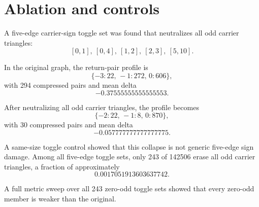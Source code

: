 \section{Ablation and controls}

A five-edge carrier-sign toggle set was found that neutralizes all odd carrier triangles:
\[
    [0,1],\ [0,4],\ [1,2],\ [2,3],\ [5,10].
\]

In the original graph, the return-pair profile is
\[
    \{-3:22,\,-1:272,\,0:606\},
\]
with 294 compressed pairs and mean delta
\[
    -0.37555555555555553.
\]

After neutralizing all odd carrier triangles, the profile becomes
\[
    \{-2:22,\,-1:8,\,0:870\},
\]
with 30 compressed pairs and mean delta
\[
    -0.057777777777777775.
\]

A same-size toggle control showed that this collapse is not generic five-edge sign damage. Among all five-edge toggle sets, only 243 of 142506 erase all odd carrier triangles, a fraction of approximately
\[
    0.0017051913603637742.
\]

A full metric sweep over all 243 zero-odd toggle sets showed that every zero-odd member is weaker than the original.
